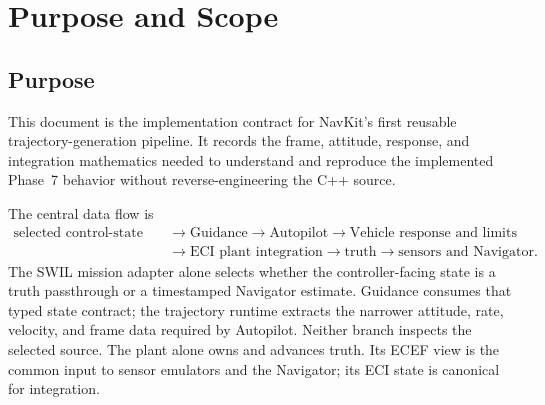 \chapter{Purpose and Scope}

\section{Purpose}

This document is the implementation contract for NavKit's first reusable
trajectory-generation pipeline. It records the frame, attitude, response, and
integration mathematics needed to understand and reproduce the implemented
Phase~7 behavior without reverse-engineering the C++ source.

The central data flow is
\begin{equation}
\begin{aligned}
\text{selected control-state source}
&\longrightarrow
\text{Guidance}
\longrightarrow
\text{Autopilot}
\longrightarrow
\text{Vehicle response and limits}\\
&\longrightarrow
\text{ECI plant integration}
\longrightarrow
\text{truth}
\longrightarrow
\text{sensors and Navigator}.
\end{aligned}
\label{eq:trajectory_pipeline}
\end{equation}
The SWIL mission adapter alone selects whether the controller-facing state is a truth
passthrough or a timestamped Navigator estimate. Guidance consumes that typed
state contract; the trajectory runtime extracts the narrower attitude, rate,
velocity, and frame data required by Autopilot. Neither branch inspects the
selected source. The plant alone owns and advances truth. Its ECEF view is the
common input to sensor emulators and the Navigator; its ECI state is canonical
for integration.

